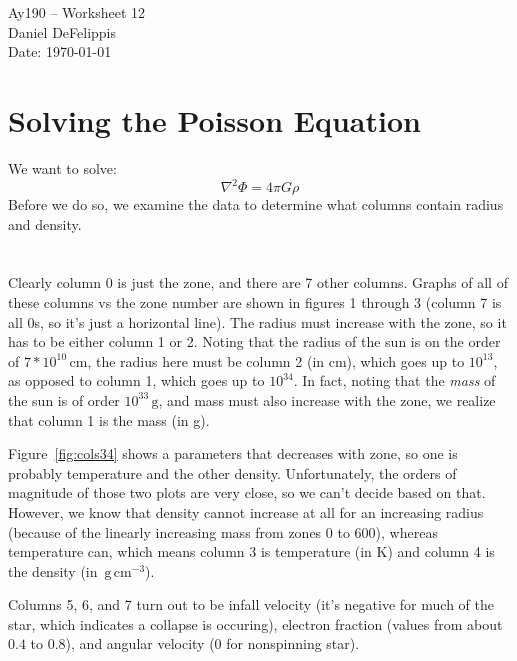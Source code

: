 \documentclass[11pt,letterpaper]{article}
\newcommand{\unit}[1]{\ensuremath{\, \mathrm{#1}}}
\begin{document}
\begin{center}
\Large
Ay190 -- Worksheet 12\\
Daniel DeFelippis\\
Date: \today
\end{center}


\section*{Solving the Poisson Equation}

We want to solve:
$$ \nabla^2 \Phi = 4\pi G \rho $$
Before we do so, we examine the data to determine what columns contain radius and density.

\section{}
Clearly column 0 is just the zone, and there are 7 other columns. Graphs of all of these
columns vs the zone number are shown in figures 1 through 3 (column 7 is all 0s, so it's 
just a horizontal line). The radius must increase with the zone, so it has to be 
either column 1 or 2. Noting that the radius of the sun is on the order of 
$7*10^{10} \unit{cm}$, the radius here must be column 2 (in cm), which goes up to
$10^{13}$, as opposed to column 1, which goes up to $10^{34}$. In fact, noting that 
the \textit{mass} of the sun is of order $10^{33} \unit{g}$, and mass must also 
increase with the zone, we realize that column 1 is the mass (in g). 

Figure~\ref{fig:cols34} shows a parameters that decreases with zone, so one is probably
temperature and the other density. Unfortunately, the orders of magnitude of those two 
plots are very close, so we can't decide based on that. However, we know that density 
cannot increase at all for an increasing radius (because of the linearly increasing mass
from zones 0 to 600), whereas temperature can, which means column 3 is temperature (in K)
and column 4 is the density (in $\unit{g}\unit{cm^{-3}}$).

Columns 5, 6, and 7 turn out to be infall velocity (it's negative for much of the star,
which indicates a collapse is occuring), electron fraction (values from about $0.4$ to $0.8$), and angular velocity (0 for nonspinning star). 
\end{document}
